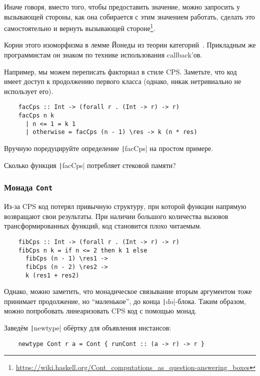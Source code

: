 Иначе говоря, вместо того, чтобы предоставить значение, можно запросить у вызывающей стороны, как она собирается с этим значением работать, сделать это самостоятельно и вернуть вызывающей стороне\footnote{\url{https://wiki.haskell.org/Cont_computations_as_question-answering_boxes}}.

Корни этого изоморфизма в лемме Йонеды из теории категорий~\cite{hinze2010reason}.
Прикладным же программистам он знаком по технике использования callback'ов.

Например, мы можем переписать факториал в стиле CPS.
Заметьте, что код имеет доступ к продолжению первого класса (однако, никак нетривиально не использует его).
\begin{verbatim}
    facCps :: Int -> (forall r . (Int -> r) -> r)
    facCps n k
      | n <= 1 = k 1
      | otherwise = facCps (n - 1) \res -> k (n * res)
\end{verbatim}

\begin{task}
    Вручную поредуцируйте определение \texttt|facCps| на простом примере.
\end{task}

\begin{task}
    Сколько функция \texttt|facCps| потребляет стековой памяти?
\end{task}

\subsubsection{Монада \texttt{Cont}}

Из-за CPS код потерял привычную структуру, при которой функции напрямую возвращают свои результаты.
При наличии большого количества вызовов трансформированных функций, код становится плохо читаемым.

\begin{verbatim}
    fibCps :: Int -> (forall r . (Int -> r) -> r)
    fibCps n k = if n <= 2 then k 1 else
      fibCps (n - 1) \res1 ->
      fibCps (n - 2) \res2 ->
      k (res1 + res2)
\end{verbatim}

Однако, можно заметить, что монадическое связывание вторым аргументом тоже принимает продолжение, но ``маленькое'', до конца \texttt|do|-блока.
Таким образом, можно попробовать линеаризовать CPS код с помощью монад.

Заведём \texttt|newtype| обёртку для объявления инстансов:
\begin{verbatim}
    newtype Cont r a = Cont { runCont :: (a -> r) -> r }
\end{verbatim}

